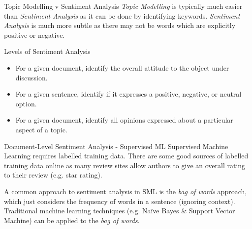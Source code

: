 \documentclass[11pt,a4paper]{article}
\begin{document}
\begin{remark}{Topic Modelling v Sentiment Analysis}
  \textit{Topic Modelling} is typically much easier than \textit{Sentiment Analysis} as it can be done by identifying keywords. \textit{Sentiment Analysis} is much more subtle as there may not be words which are explicitly positive or negative.
\end{remark}

\begin{proposition}{Levels of Sentiment Analysis}
  \begin{itemize}
    \item[\textit{Document-Level}] For a given document, identify the overall attitude to the object under discussion.
    \item[\textit{Sentence-Level}] For a given sentence, identify if it expresses a positive, negative, or neutral option.
    \item[\textit{Aspect-Level}] For a given document, identify all opinions expressed about a particular aspect of a topic.
  \end{itemize}
\end{proposition}

\begin{proposition}{Document-Level Sentiment Analysis - Supervised ML}
  Supervised Machine Learning requires labelled training data. There are some good sources of labelled training data online as many review sites allow authors to give an overall rating to their review (e.g. star rating).
  \par A common approach to sentiment analysis in SML is the \textit{bag of words} approach, which just considers the frequency of words in a sentence (ignoring context). Traditional machine learning techniques (e.g. Na\"ive Bayes \& Support Vector Machine) can be applied to the \textit{bag of words}.
\end{proposition}
\end{document}
